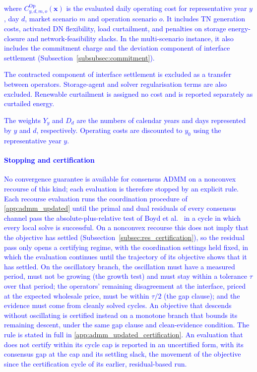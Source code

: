 \documentclass[preprint,12pt]{elsarticle}
\begin{document}
\noindent
\textcolor{blue}{
    where 
    $C^{\text{Op}}_{y,d,m,o}(\boldsymbol{x})$ is the evaluated daily operating cost for representative year $y$, day $d$, market scenario $m$ and operation scenario $o$. It includes TN generation costs, activated DN flexibility, load curtailment, and penalties on storage energy-closure and network-feasibility slacks. In the multi-scenario instance, it also includes the commitment charge and the deviation component of interface settlement (Subsection~\ref{subsubsec:commitment}).
}

\textcolor{blue}{
    The contracted component of interface settlement is excluded as a transfer between operators. Storage-agent and solver regularisation terms are also excluded. Renewable curtailment is assigned no cost and is reported separately as curtailed energy.
}

\textcolor{blue}{
    The weights $Y_y$ and $D_d$ are the numbers of calendar years and days represented by $y$ and $d$, respectively. Operating costs are discounted to $y_0$ using the representative year $y$.
}

\textcolor{blue}{
    \paragraph{Stopping and certification} 
    No convergence guarantee is available for consensus ADMM on a nonconvex recourse of this kind; each evaluation is therefore stopped by an explicit rule.
    Each recourse evaluation runs the coordination procedure of \ref{app:admm_updated} until the primal and dual residuals of every consensus channel pass the absolute-plus-relative test of Boyd et al.~\cite{boyd_admm_2011} in a cycle in which every local solve is successful. On a nonconvex recourse this does not imply that the objective has settled (Subsection~\ref{subsec:res_certification}), so the residual pass only opens a certifying regime, with the coordination settings held fixed, in which the evaluation continues until the trajectory of its objective shows that it has settled. On the oscillatory branch, the oscillation must have a measured period, must not be growing (the growth test) and must stay within a tolerance $\tau$ over that period; the operators' remaining disagreement at the interface, priced at the expected wholesale price, must be within $\tau/2$ (the gap clause); and the evidence must come from cleanly solved cycles. An objective that descends without oscillating is certified instead on a monotone branch that bounds its remaining descent, under the same gap clause and clean-evidence condition. The rule is stated in full in \ref{app:admm_updated_certification}. An evaluation that does not certify within its cycle cap is reported in an uncertified form, with its consensus gap at the cap and its settling slack, the movement of the objective since the certification cycle of its earlier, residual-based run.
}
\end{document}
